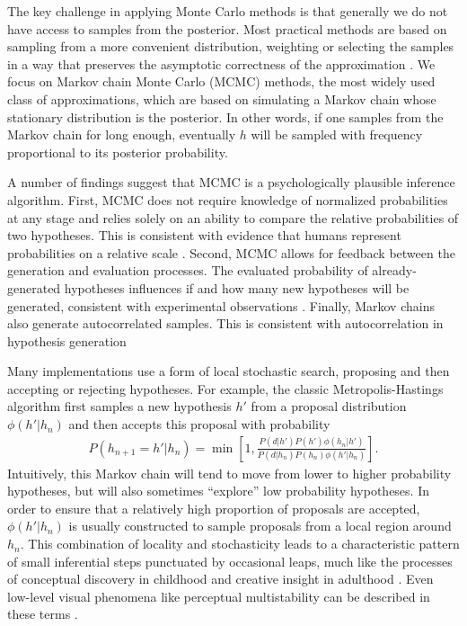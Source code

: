 The key challenge in applying Monte Carlo methods is that generally we do not have access to samples from the posterior. Most practical methods are based on sampling from a more convenient distribution, weighting or selecting the samples in a way that preserves the asymptotic correctness of the approximation \citep{mackay2003information}. We focus on Markov chain Monte Carlo (MCMC) methods, the most widely used class of approximations, which are based on simulating a Markov chain whose stationary distribution is the posterior. In other words, if one samples from the Markov chain for long enough, eventually $h$ will be sampled with frequency proportional to its posterior probability.

A number of findings suggest that MCMC is a psychologically plausible inference algorithm. First, MCMC does not require knowledge of normalized probabilities at any stage and relies solely on an ability to compare the relative probabilities of two hypotheses. This is consistent with evidence that humans represent probabilities on a relative scale \citep{stewart06}. Second, MCMC allows for feedback between the generation and evaluation processes. The evaluated probability of already-generated hypotheses influences if and how many new hypotheses will be generated, consistent with experimental observations \citep{hamrick15}. Finally, Markov chains also generate autocorrelated samples. This is consistent with autocorrelation in hypothesis generation \citep{bonawitz14,gershman12,vul08,lieder2017anchoring}

Many implementations use a form of local stochastic search, proposing and then accepting or rejecting hypotheses. For example, the classic Metropolis-Hastings algorithm first samples a new hypothesis $h'$ from a proposal distribution $\phi(h'|h_n)$ and then accepts this proposal with probability
\begin{align}
P(h_{n+1}=h'|h_n) = \min\left[1, \frac{P(d|h')P(h') \phi(h_n|h')}{P(d|h_n)P(h_n) \phi(h'|h_n)}\right].
\label{eq:MH-step}
\end{align}
Intuitively, this Markov chain will tend to move from lower to higher probability hypotheses, but will also sometimes ``explore'' low probability hypotheses. In order to ensure that a relatively high proportion of proposals are accepted, $\phi(h'|h_n)$ is usually constructed to sample proposals from a local region around $h_n$. This combination of locality and stochasticity leads to a characteristic pattern of small inferential steps punctuated by occasional leaps, much like the processes of conceptual discovery in childhood \citep{ullman2012theory} and creative insight in adulthood \citep{suchow2017evolution}. Even low-level visual phenomena like perceptual multistability can be described in these terms \citep{gershman12,Moreno11}.


